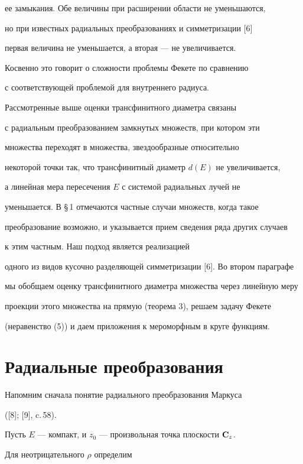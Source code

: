 ее замыкания. Обе величины при расширении области не уменьшаются,


но при известных радиальных преобразованиях и симметризации [6]


первая величина не уменьшается, а вторая --- не увеличивается.


Косвенно это говорит о сложности проблемы Фекете по сравнению


с соответствующей проблемой для внутреннего радиуса.





Рассмотренные выше оценки трансфинитного диаметра связаны


с радиальным преобразованием замкнутых множеств, при котором эти


множества переходят в множества, звездообразные относительно


некоторой точки так, что трансфинитный диаметр $d(E)$ не увеличивается,


а линейная мера пересечения $E$ с системой радиальных лучей не


уменьшается. В \S\,1 отмечаются частные случаи множеств, когда такое


преобразование возможно, и указывается прием сведения ряда других случаев


к этим частным. Наш подход является реализацией


одного из видов кусочно разделяющей симметризации [6]. Во втором параграфе


мы  обобщаем оценку трансфинитного диаметра множества через линейную меру


проекции этого множества на прямую (теорема 3), решаем задачу Фекете


(неравенство (5)) и даем приложения к мероморфным в круге функциям.





\section{Радиальные преобразования}





Напомним сначала понятие радиального преобразования Маркуса


([8]; [9], c.\,58).


Пусть $E$ --- компакт, и $z_0$ --- произвольная точка плоскости $\bold C_z$.


Для неотрицательного $\rho $ определим 


